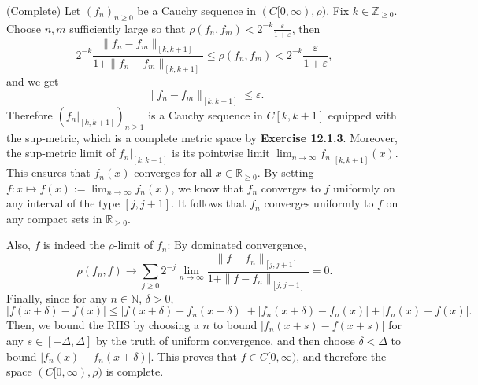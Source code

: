 \documentclass[12pt]{extarticle}
\begin{document}
(Complete)
Let $(f_n)_{n\geq 0}$ be a Cauchy sequence in $(C[0,\infty),\rho)$.
Fix $k\in\mathbb{Z}_{\geq 0}$.
Choose $n,m$ sufficiently large so that $\rho(f_n,f_m)<2^{-k}\frac{\varepsilon}{1+\varepsilon}$, then
\[
2^{-k}\frac{\|f_n-f_m\|_{[k,k+1]}}{1+\|f_n-f_m\|_{[k,k+1]}}
\leq
\rho	(f_n,f_m)<2^{-k}\frac{\varepsilon}{1+\varepsilon},
\]
and we get
\[
\|f_n-f_m\|_{[k,k+1]}\leq\varepsilon.
\]
Therefore $(f_n|_{[k,k+1]})_{n\geq 1}$ is a Cauchy sequence in $C[k,k+1]$ equipped with the sup-metric, which is a complete metric space by {\bf Exercise 12.1.3}.
Moreover, the sup-metric limit of $f_n|_{[k,k+1]}$ is its pointwise limit $\lim_{n\rightarrow\infty}f_n|_{[k,k+1]}(x)$.
This ensures that $f_n(x)$ converges for all $x\in\mathbb{R}_{\geq 0}$. By setting $f:x\mapsto f(x):=\lim_{n\rightarrow\infty}f_n(x)$, we know that $f_n$ converges to $f$ uniformly on any interval of the type $[j,j+1]$.
It follows that $f_n$ converges uniformly to $f$ on any compact sets in $\mathbb{R}_{\geq 0}$.

Also, $f$ is indeed the $\rho$-limit of $f_n$: By dominated convergence,
\[
\rho(f_n,f)\rightarrow\sum_{j\geq 0}2^{-j}\lim_{n\rightarrow\infty}\frac{\|f-f_n\|_{[j,j+1]}}{1+\|f-f_n\|_{[j,j+1]}}=0.
\]
Finally, since for any $n\in\mathbb{N}$, $\delta>0$,
\[
|f(x+\delta)-f(x)|\leq|f(x+\delta)-f_n(x+\delta)|+|f_n(x+\delta)-f_n(x)|+|f_n(x)-f(x)|.
\]
Then, we bound the RHS by choosing a $n$ to bound $|f_n(x+s)-f(x+s)|$ for any $s\in[-\Delta,\Delta]$ by the truth of uniform convergence, and then choose $\delta<\Delta$ to bound $|f_n(x)-f_n(x+\delta)|$.
This proves that $f\in C[0,\infty)$, and therefore the space $(C[0,\infty),\rho)$ is complete.


\end{document}
